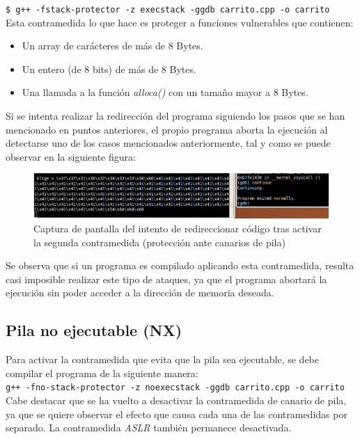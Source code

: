 \documentclass[10pt,a4paper]{article}
\begin{document}
\texttt{\$ g++ -fstack-protector -z execstack -ggdb carrito.cpp -o carrito}\\

Esta contramedida lo que hace es proteger a funciones vulnerables que contienen:  
\begin{itemize}
	\item Un array de carácteres de más de 8 Bytes.
	\item Un entero (de 8 bits) de más de 8 Bytes.
	\item Una llamada a la función \textit{alloca()} con un tamaño mayor a 8 Bytes.
\end{itemize}

Si se intenta realizar la redirección del programa siguiendo los pasos que se han mencionado en puntos anteriores, el propio programa aborta la ejecución al detectarse uno de los casos mencionados anteriormente, tal y como se puede observar en la siguiente figura:

\begin{figure}[h!]
	\centering
	\includegraphics[scale=0.6]{images/contramedida_2.png}
	\caption{Captura de pantalla del intento de redireccionar código tras activar la segunda contramedida (protección ante canarios de pila)}
	\label{fig:contramedida2}
\end{figure}

Se observa que si un programa es compilado aplicando esta contramedida, resulta casi imposible realizar este tipo de ataques, ya que el programa abortará la ejecución sin poder acceder a la dirección de memoria deseada.

\subsection{Pila no ejecutable (NX)}
Para activar la contramedida que evita que la pila sea ejecutable, se debe compilar el programa de la siguiente manera: \\

\texttt{g++ -fno-stack-protector -z noexecstack -ggdb carrito.cpp -o carrito}\\

Cabe destacar que se ha vuelto a desactivar la contramedida de canario de pila, ya que se quiere observar el efecto que causa cada una de las contramedidas por separado. La contramedida \textit{ASLR} también permanece desactivada.\\
\end{document}
